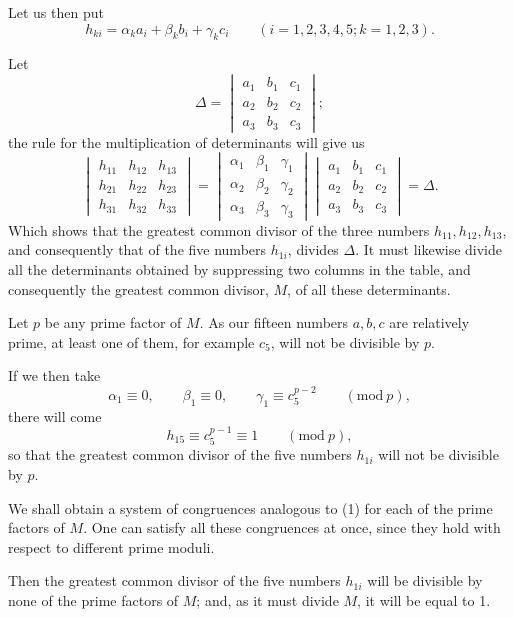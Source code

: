 \documentclass{article}
\begin{document}
Let us then put
\[ h_{ki} = \alpha_{k} a_{i} + \beta_{k} b_{i} + \gamma_{k} c_{i} \qquad (i = 1, 2, 3, 4, 5; k = 1, 2, 3). \]

Let
\[ \Delta = \begin{vmatrix} a_{1} & b_{1} & c_{1} \\[1ex] a_{2} & b_{2} & c_{2} \\[1ex] a_{3} & b_{3} & c_{3} \end{vmatrix}; \]
the rule for the multiplication of determinants will give us
\[ \begin{vmatrix} h_{11} & h_{12} & h_{13} \\[1ex] h_{21} & h_{22} & h_{23} \\[1ex] h_{31} & h_{32} & h_{33} \end{vmatrix} = \begin{vmatrix} \alpha_{1} & \beta_{1} & \gamma_{1} \\[1ex] \alpha_{2} & \beta_{2} & \gamma_{2} \\[1ex] \alpha_{3} & \beta_{3} & \gamma_{3} \end{vmatrix} \begin{vmatrix} a_{1} & b_{1} & c_{1} \\[1ex] a_{2} & b_{2} & c_{2} \\[1ex] a_{3} & b_{3} & c_{3} \end{vmatrix} = \Delta. \]
Which shows that the greatest common divisor of the three numbers $h_{11}, h_{12}, h_{13}$, and consequently that of the five numbers $h_{1i}$, divides $\Delta$. It must likewise divide all the determinants obtained by suppressing two columns in the table, and consequently the greatest common divisor, $M$, of all these determinants.

Let $p$ be any prime factor of $M$. As our fifteen numbers $a, b, c$ are relatively prime, at least one of them, for example $c_{5}$, will not be divisible by $p$.

If we then take
\[ \alpha_{1} \equiv 0, \qquad \beta_{1} \equiv 0, \qquad \gamma_{1} \equiv c^{p-2}_{5} \qquad (\text{mod}\ p), \tag{1} \]
there will come
\[ h_{15} \equiv c^{p-1}_{5} \equiv 1 \qquad (\text{mod}\ p), \]
so that the greatest common divisor of the five numbers $h_{1i}$ will not be divisible by $p$.

We shall obtain a system of congruences analogous to (1) for each of the prime factors of $M$. One can satisfy all these congruences at once, since they hold with respect to different prime moduli.

Then the greatest common divisor of the five numbers $h_{1i}$ will be
divisible by none of the prime factors of $M$; and, as it must divide $M$, it will be equal to 1.
\end{document}
